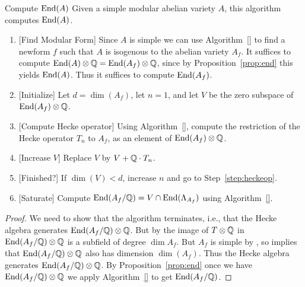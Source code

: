 \documentclass{article}
\begin{document}
\begin{algorithm}{Compute $\operatorname{End}(A)$}
Given a simple modular abelian variety $A$, this algorithm
computes $\operatorname{End}(A)$.
\begin{enumerate}
\item{} [Find Modular Form] Since $A$ is simple we can use
  Algorithm~\ref{} to find a newform $f$ such that $A$ is isogenous to
  the abelian variety $A_f$.  It suffices to compute $\operatorname{End}(A)\otimes\mathbb{Q}
  = \operatorname{End}(A_f)\otimes\mathbb{Q}$, since by Proposition~\ref{prop:end} this
  yields $\operatorname{End}(A)$.  Thus it suffices to compute $\operatorname{End}(A_f)$.
\item{} [Initialize] Let $d=\dim(A_f)$, let $n=1$, and let $V$ be the
  zero subspace of $\operatorname{End}(A_f)\otimes\mathbb{Q}$.
\item{} [Compute Hecke operator]\label{step:heckeop} Using
  Algorithm~\ref{}, compute the restriction of the Hecke operator
  $T_n$ to $A_f$, as an element of $\operatorname{End}(A_f)\otimes\mathbb{Q}$.
\item{} [Increase $V$] Replace $V$ by $V+\mathbb{Q}\cdot T_n$.
\item{} [Finished?]  If $\dim(V) < d$, increase $n$ and go to
  Step~\ref{step:heckeop}.
\item{} [Saturate] Compute $\operatorname{End}(A_f/\mathbb{Q}) = V \cap \operatorname{End}(\Lambda_{A_f})$
  using Algorithm~\ref{}.
\end{enumerate}
\end{algorithm}
\begin{proof}
  We need to show that the algorithm terminates, i.e., that the Hecke
  algebra generates $\operatorname{End}(A_f/\mathbb{Q}) \otimes \mathbb{Q}$. But by
  \cite[Thm.~1]{shimura:factors} the image of $T \otimes \mathbb{Q}$ in
  $\operatorname{End}(A_f/\mathbb{Q}) \otimes \mathbb{Q}$ is a subfield of degree $\dim A_f$. But
  $A_f$ is simple by \cite[Cor.~4.2]{ribet:twistsendoalg}, so
  \cite[Thm.~2.1]{ribet:abvars} implies that $\operatorname{End}(A_f/\mathbb{Q}) \otimes \mathbb{Q}$
  also has dimension $\dim(A_f)$. Thus the Hecke algebra generates
  $\operatorname{End}(A_f/\mathbb{Q}) \otimes \mathbb{Q}$. By Proposition~\ref{prop:end} once we
  have $\operatorname{End}(A_f/\mathbb{Q}) \otimes \mathbb{Q}$ we apply Algorithm~\ref{} to get
  $\operatorname{End}(A_f/\mathbb{Q})$.
\end{proof}
\end{document}

